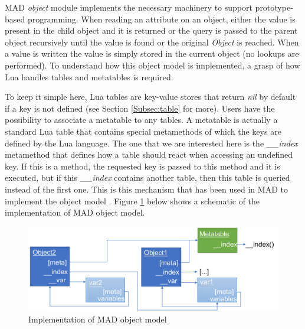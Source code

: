 
MAD \emph{object} module implements the necessary machinery to support prototype-based
programming. When reading an attribute on an object, either the value is present
in the child object and it is returned or the query is passed to the parent
object recursively until the value is found or the original \emph{Object} is
reached. When a value is written the value is simply stored in the current
object (no lookups are performed). To understand how this object model is
implemented, a grasp of how Lua handles tables and metatables is required.

To keep it simple here, Lua tables are key-value stores that return \emph{nil} by
default if a key is not defined (see Section \ref{Subsec:table} for more).
Users have the possibility to associate a metatable to any tables. A metatable
is actually a standard Lua table that contains special metamethods of which
the keys are defined by the Lua language. The one that we are interested here is
the \emph{\_\_index} metamethod that defines how a table should react when accessing
an undefined key. If this is a method, the requested key is passed to this method
and it is executed, but if this \emph{\_\_index} contains another table, then this
table is queried instead of the first one. This is this mechanism that has been
used in MAD to implement the object model . Figure \ref{fig:MO-descriptinon} below
shows a schematic of the implementation of MAD object model.

\begin{figure}[H]
    \centering
    \includegraphics[width=\textwidth]{./Images/MO.pdf}
    \caption{Implementation of MAD object model}
    \label{fig:MO-descriptinon}
\end{figure}


